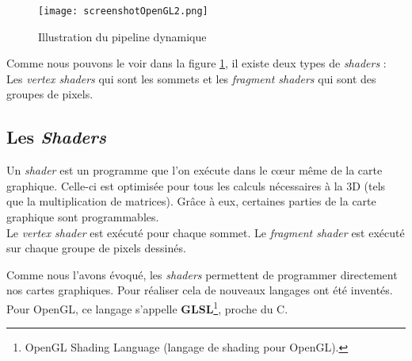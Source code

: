 \documentclass[11pt]{report}
\begin{document}
\begin{figure}[h!]
  \caption{Illustration du pipeline dynamique\cite{screenshotOpenGL2}}
  \centering
    \texttt{[image: screenshotOpenGL2.png]}
    \label{PipelineP}
\end{figure}
 

Comme nous pouvons le voir dans la figure \ref{PipelineP}, il existe deux types de \textit{shaders} : Les \textit{vertex shaders} qui sont les sommets et les \textit{fragment shaders} qui sont des groupes de pixels.

\subsection{Les \textit{Shaders}}
\label{EtatArtShaders}
Un \textit{shader} est un programme que l'on exécute dans le cœur même de la carte graphique. Celle-ci est optimisée pour tous les calculs nécessaires à la 3D (tels que la multiplication de matrices). Grâce à eux, certaines parties de la carte graphique sont programmables. 
\\

    Le \textit{vertex shader} est exécuté pour chaque sommet.
    Le \textit{fragment shader} est exécuté sur chaque groupe de pixels dessinés. %



Comme nous l'avons évoqué, les \textit{shaders} permettent de programmer directement nos cartes graphiques. Pour réaliser cela de nouveaux langages ont été inventés. Pour OpenGL, ce langage s'appelle \textbf{GLSL}\footnote{OpenGL Shading Language (langage de shading pour OpenGL).}, proche du C.
\end{document}
